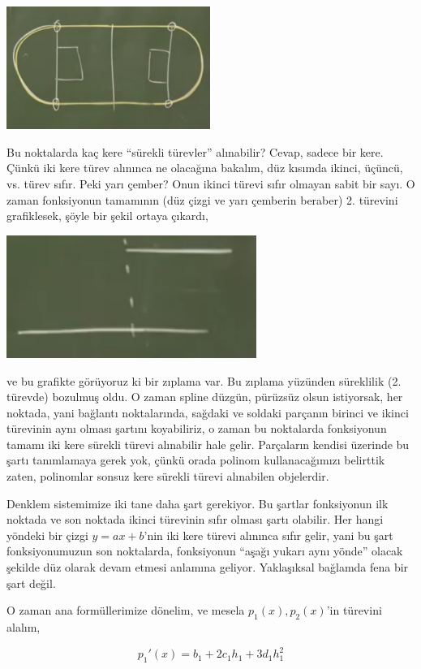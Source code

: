 \documentclass[12pt,fleqn]{article}\usepackage{../../common}
\begin{document}
\includegraphics[height=4cm]{spline7.png}

Bu noktalarda kaç kere ``sürekli türevler'' alınabilir? Cevap, sadece bir
kere. Çünkü iki kere türev alınınca ne olacağına bakalım, düz kısımda
ikinci, üçüncü, vs. türev sıfır. Peki yarı çember? Onun ikinci türevi sıfır
olmayan sabit bir sayı. O zaman fonksiyonun tamamının (düz çizgi ve yarı
çemberin beraber) 2. türevini grafiklesek, şöyle bir şekil ortaya çıkardı,

\includegraphics[height=4cm]{spline8.png}

ve bu grafikte görüyoruz ki bir zıplama var. Bu zıplama yüzünden süreklilik
(2. türevde) bozulmuş oldu. O zaman spline düzgün, pürüzsüz olsun istiyorsak, her noktada, yani
bağlantı noktalarında, sağdaki ve soldaki parçanın birinci ve ikinci
türevinin aynı olması şartını koyabiliriz, o zaman bu noktalarda
fonksiyonun tamamı iki kere sürekli türevi alınabilir hale
gelir. Parçaların kendisi üzerinde bu şartı tanımlamaya gerek yok, çünkü
orada polinom kullanacağımızı belirttik zaten, polinomlar sonsuz kere
sürekli türevi alınabilen objelerdir. 

Denklem sistemimize iki tane daha şart gerekiyor. Bu şartlar fonksiyonun
ilk noktada ve son noktada ikinci türevinin sıfır olması şartı
olabilir. Her hangi yöndeki bir çizgi $y = ax + b$'nin iki kere türevi
alınınca sıfır gelir, yani bu şart fonksiyonumuzun son noktalarda,
fonksiyonun ``aşağı yukarı aynı yönde'' olacak şekilde düz olarak devam
etmesi anlamına geliyor. Yaklaşıksal bağlamda fena bir şart değil. 

O zaman ana formüllerimize dönelim, ve mesela $p_1(x),p_2(x)$'in türevini
alalım,

$$ p_1'(x) = b_1 + 2c_1h_1 + 3d_1h_1^2 $$
\end{document}
